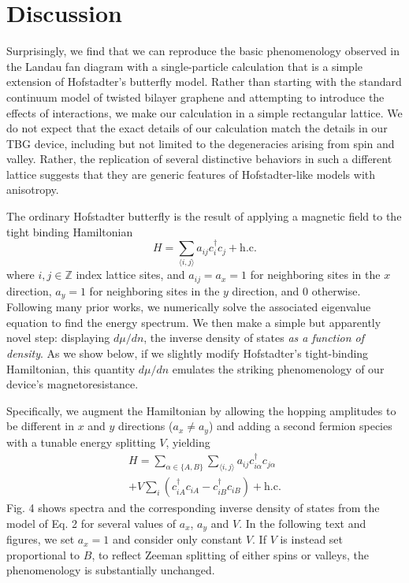 \documentclass[12pt,twocolumn]{article}
\begin{document}
\section{Discussion}

\noindent Surprisingly, we find that we can reproduce the basic phenomenology observed in the Landau fan diagram with a single-particle calculation that is a simple extension of Hofstadter’s butterfly model. Rather than starting with the standard continuum model of twisted bilayer graphene \cite{bistritzerMoirButterfliesTwisted2011,koshinoEffectiveContinuumModel2020} and attempting to introduce the effects of interactions, we make our calculation in a simple rectangular lattice. We do not expect that the exact details of our calculation match the details in our TBG device, including but not limited to the degeneracies arising from spin and valley. Rather, the replication of several distinctive behaviors in such a different lattice suggests that they are generic features of Hofstadter-like models with anisotropy.

The ordinary Hofstadter butterfly is the result of applying a magnetic field to the tight binding Hamiltonian
\begin{equation}
H = \sum_{\langle i,j \rangle}a_{ij}c_i^\dagger c_j + \mathrm{h.c.}
\end{equation}
where $i,j\in \mathbb{Z}$ index lattice sites, and $a_{ij}=a_x=1$ for neighboring sites in the $x$ direction, $a_y=1$ for neighboring sites in the $y$ direction, and 0 otherwise. Following many prior works, we numerically solve the associated eigenvalue equation to find the energy spectrum. We then make a simple but apparently novel step: displaying $d\mu /dn$, the inverse density of states \textit{as a function of density}. As we show below, if we slightly modify Hofstadter’s tight-binding Hamiltonian, this quantity $d\mu /dn$ emulates the striking phenomenology of our device’s magnetoresistance.

Specifically, we augment the Hamiltonian by allowing the hopping amplitudes to be different in $x$ and $y$ directions ($a_x \neq a_y$) and adding a second fermion species with a tunable energy splitting $V$, yielding
\begin{multline}
H = \sum_{\alpha\in\{A,B\}}\sum_{\langle i,j\rangle}a_{ij}c_{i\alpha}^\dagger c_{j\alpha}\\ + V\sum_i\left(c_{iA}^\dagger c_{iA} - c_{iB}^\dagger c_{iB}\right)+ \mathrm{h.c.}
\end{multline}
Fig. 4 shows spectra and the corresponding inverse density of states from the model of Eq. 2 for several values of $a_x$, $a_y$ and $V$. In the following text and figures, we set $a_x=1$ and consider only constant $V$. If $V$ is instead set proportional to $B$, to reflect Zeeman splitting of either spins or valleys, the phenomenology is substantially unchanged.
\end{document}
